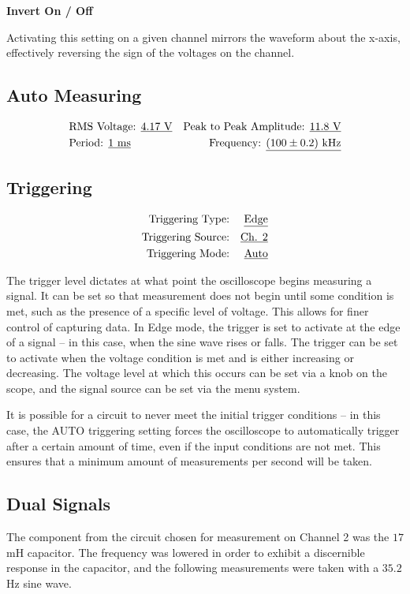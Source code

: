 \documentclass[twocolumn,english]{IEEEtran}
\theoremstyle{plain}
\theoremstyle{plain}
\begin{document}
\noindent\textbf{Invert On / Off}

Activating this setting on a given channel mirrors the waveform about the x-axis, effectively reversing the sign of the voltages on the channel.

\subsection{Auto Measuring}
\begin{align*}
 &\text{RMS Voltage: \underline{$4.17$ V}}	&\text{Peak to Peak Amplitude: \underline{$11.8$ V}} 	\\
 &\text{Period: \underline{$1$ ms}} 		&\text{Frequency: \underline{$(100 \pm 0.2)$ kHz}}	\\
\end{align*}

\subsection{Triggering}
\begin{align*}
 \text{Triggering Type:}&	&\text{\underline{Edge}}\\
 \text{Triggering Source:}&	&\text{\underline{Ch. 2}}\\
 \text{Triggering Mode:}&	&\text{\underline{Auto}}
\end{align*}

The trigger level dictates at what point the oscilloscope begins measuring a signal. It can be set so that measurement does not begin until some condition is met, such as the presence of a specific level of voltage. This allows for finer control of capturing data. In Edge mode, the trigger is set to activate at the edge of a signal -- in this case, when the sine wave rises or falls. The trigger can be set to activate when the voltage condition is met and is either increasing or decreasing. The voltage level at which this occurs can be set via a knob on the scope, and the signal source can be set via the menu system.

It is possible for a circuit to never meet the initial trigger conditions -- in this case, the AUTO triggering setting forces the oscilloscope to automatically trigger after a certain amount of time, even if the input conditions are not met. This ensures that a minimum amount of measurements per second will be taken.

\subsection{Dual Signals}
The component from the circuit chosen for measurement on Channel 2 was the $17$ mH capacitor. The frequency was lowered in order to exhibit a discernible response in the capacitor, and the following measurements were taken with a $35.2$ Hz sine wave. \\
\end{document}
